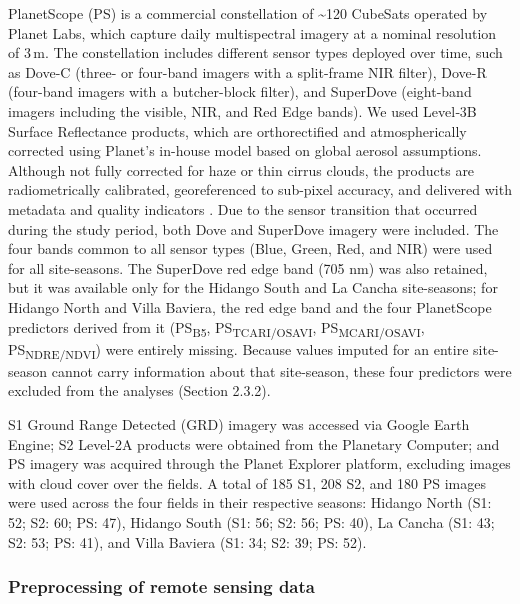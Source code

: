 \documentclass[
  english,
  review,
  number,
  sort,compress,
  authoryear,
  3p]{elsarticle}
\begin{document}
PlanetScope (PS) is a commercial constellation of \textasciitilde120
CubeSats operated by Planet Labs, which capture daily multispectral
imagery at a nominal resolution of 3\,m. The constellation includes
different sensor types deployed over time, such as Dove-C (three- or
four-band imagers with a split-frame NIR filter), Dove-R (four-band
imagers with a butcher-block filter), and SuperDove (eight-band imagers
including the visible, NIR, and Red Edge bands). We used Level‑3B
Surface Reflectance products, which are orthorectified and
atmospherically corrected using Planet's in-house model based on global
aerosol assumptions. Although not fully corrected for haze or thin
cirrus clouds, the products are radiometrically calibrated,
georeferenced to sub-pixel accuracy, and delivered with metadata and
quality indicators \citep{Roy2021}. Due to the sensor transition that
occurred during the study period, both Dove and SuperDove imagery were
included. The four bands common to all sensor types (Blue, Green, Red,
and NIR) were used for all site-seasons. The SuperDove red edge band
(705 nm) was also retained, but it was available only for the Hidango
South and La Cancha site-seasons; for Hidango North and Villa Baviera,
the red edge band and the four PlanetScope predictors derived from it
(PS\textsubscript{B5}, PS\textsubscript{TCARI/OSAVI},
PS\textsubscript{MCARI/OSAVI}, PS\textsubscript{NDRE/NDVI}) were
entirely missing. Because values imputed for an entire site-season
cannot carry information about that site-season, these four predictors
were excluded from the analyses (Section 2.3.2).

S1 Ground Range Detected (GRD) imagery was accessed via Google Earth
Engine; S2 Level-2A products were obtained from the Planetary Computer;
and PS imagery was acquired through the Planet Explorer platform,
excluding images with cloud cover over the fields. A total of 185 S1,
208 S2, and 180 PS images were used across the four fields in their
respective seasons: Hidango North (S1: 52; S2: 60; PS: 47), Hidango
South (S1: 56; S2: 56; PS: 40), La Cancha (S1: 43; S2: 53; PS: 41), and
Villa Baviera (S1: 34; S2: 39; PS: 52).

\subsubsection{Preprocessing of remote sensing
data}\label{preprocessing-of-remote-sensing-data}
\end{document}
